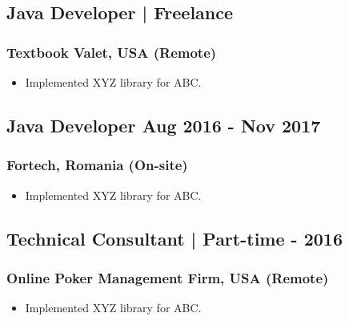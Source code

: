 \documentclass[11pt]{article}
\begin{document}
    \subsection{Java Developer | Freelance \hfill {}}
    \subsubsection{Textbook Valet, USA (Remote)}
    \begin{itemize}
        \item[\checkmark]  Implemented XYZ library for ABC.
    \end{itemize}
    
    \subsection{Java Developer \hfill \normalfont Aug 2016 - Nov 2017}
    \subsubsection{Fortech, Romania (On-site)}
    \begin{itemize}
        \item[\checkmark]  Implemented XYZ library for ABC.
    \end{itemize}
    
    \subsection{Technical Consultant | Part-time \hfill {} - 2016}
    \subsubsection{Online Poker Management Firm, USA (Remote)}
    \begin{itemize}
        \item[\checkmark]  Implemented XYZ library for ABC.
    \end{itemize}
\end{document}
